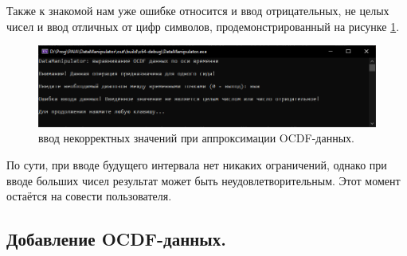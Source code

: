 {\standartFont

  \par Также к знакомой нам уже ошибке относится и ввод отрицательных, не целых чисел и ввод отличных от цифр символов, продемонстрированный на рисунке \ref{fig:OCDFapprerr1}.

  \begin{figure}[H]
    \centering
    \includegraphics[width=\textwidth]{images/forDataManipulator/OCDFApprErr1.png}
    \caption{ввод некорректных значений при аппроксимации OCDF-данных.} 
    \label{fig:OCDFapprerr1}
  \end{figure}

  \par По сути, при вводе будущего интервала нет никаких ограничений, однако при вводе больших чисел результат может быть неудовлетворительным. Этот момент остаётся на совести пользователя. 

  \par 
}

\subsection{ \standartTitleFont
  Добавление OCDF-данных.
} \label{subsec:OCDFAddData}

